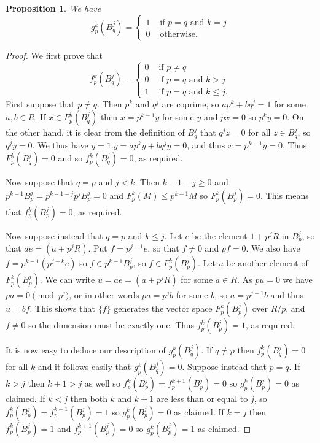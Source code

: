\documentclass{amsart}
\renewcommand{\:}{\colon}
\newtheorem{proposition}[theorem]{Proposition}
\theoremstyle{definition}
\begin{document}
\begin{proposition}
 We have 
 \[ g_p^k(B_q^j) = \begin{cases}
     1 & \text{ if } p=q \text{ and } k=j \\
     0 & \text{ otherwise. }
 \end{cases} \]
\end{proposition}
\begin{proof}
 We first prove that
 \[ f_p^k(B_q^j) = \begin{cases}
     0 & \text{ if } p\neq q \\
     0 & \text{ if } p=q \text{ and } k>j \\
     1 & \text{ if } p=q \text{ and } k\leq j.
 \end{cases} \]
 First suppose that $p\neq q$.  Then $p^k$ and $q^j$ are coprime, so
 $ap^k+bq^j=1$ for some $a,b\in R$.  If $x\in F_p^k(B_q^j)$ then
 $x=p^{k-1}y$ for some $y$ and $px=0$ so $p^ky=0$.  On the other hand,
 it is clear from the definition of $B_q^j$ that $q^jz=0$ for all
 $z\in B_q^j$, so $q^jy=0$.  We thus have $y=1.y=ap^ky+bq^jy=0$, and
 thus $x=p^{k-1}y=0$.  Thus $F_p^k(B_q^j)=0$ and so $f_p^k(B_q^j)=0$,
 as required.

 Now suppose that $q=p$ and $j<k$.  Then $k-1-j\geq 0$ and
 $p^{k-1}B_p^j=p^{k-1-j}p^jB_p^j=0$ and $F_p^k(M)\leq p^{k-1}M$ so
 $F_p^k(B_p^j)=0$.  This means that $f_p^k(B_p^j)=0$, as required.

 Now suppose instead that $q=p$ and $k\leq j$.  Let $e$ be the element
 $1+p^jR$ in $B_p^j$, so that $ae=(a+p^jR)$.  Put $f=p^{j-1}e$, so
 that $f\neq 0$ and $pf=0$.  We also have $f=p^{k-1}(p^{j-k}e)$ so 
 $f\in p^{k-1}B_p^j$, so $f\in F_p^k(B_p^j)$.  Let $u$ be another
 element of $F_p^k(B_p^j)$.  We can write $u=ae=(a+p^jR)$ for some
 $a\in R$.  As $pu=0$ we have $pa=0\pmod{p^j}$, or in other words
 $pa=p^jb$ for some $b$, so $a=p^{j-1}b$ and thus $u=bf$.  This shows
 that $\{f\}$ generates the vector space $F_p^k(B_p^j)$ over $R/p$,
 and $f\neq 0$ so the dimension must be exactly one.  Thus
 $f_p^k(B_p^j)=1$, as required.

 It is now easy to deduce our description of $g_p^k(B_q^j)$.  If
 $q\neq p$ then $f_p^k(B_q^j)=0$ for all $k$ and it follows easily
 that $g_p^k(B_q^j)=0$.  Suppose instead that $p=q$.  If $k>j$ then
 $k+1>j$ as well so $f_p^k(B_p^j)=f_p^{k+1}(B_p^j)=0$ so
 $g_p^k(B_p^j)=0$ as claimed.  If $k<j$ then both $k$ and $k+1$ are
 less than or equal to $j$, so $f_p^k(B_p^j)=f_p^{k+1}(B_p^j)=1$ so
 $g_p^k(B_p^j)=0$ as claimed.  If $k=j$ then $f_p^k(B_p^j)=1$ and
 $f_p^{k+1}(B_p^j)=0$ so $g_p^k(B_p^j)=1$ as claimed.
\end{proof}
\end{document}

